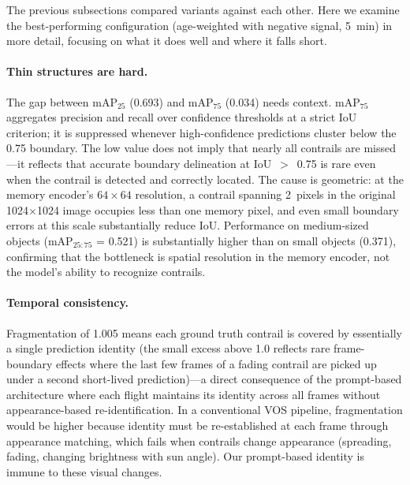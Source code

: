 \documentclass[review]{elsarticle}
\begin{document}
The previous subsections compared variants against each other. Here we examine the best-performing configuration (age-weighted with negative signal, 5~min) in more detail, focusing on what it does well and where it falls short.

\paragraph{Thin structures are hard.} The gap between mAP$_{25}$ (0.693) and mAP$_{75}$ (0.034) needs context. mAP$_{75}$ aggregates precision and recall over confidence thresholds at a strict IoU criterion; it is suppressed whenever high-confidence predictions cluster below the 0.75 boundary. The low value does not imply that nearly all contrails are missed---it reflects that accurate boundary delineation at IoU~$>$~0.75 is rare even when the contrail is detected and correctly located. The cause is geometric: at the memory encoder's $64\times64$ resolution, a contrail spanning 2~pixels in the original 1024$\times$1024 image occupies less than one memory pixel, and even small boundary errors at this scale substantially reduce IoU. Performance on medium-sized objects (mAP$_{25{:}75}$ = 0.521) is substantially higher than on small objects (0.371), confirming that the bottleneck is spatial resolution in the memory encoder, not the model's ability to recognize contrails.

\paragraph{Temporal consistency.} Fragmentation of 1.005 means each ground truth contrail is covered by essentially a single prediction identity (the small excess above 1.0 reflects rare frame-boundary effects where the last few frames of a fading contrail are picked up under a second short-lived prediction)---a direct consequence of the prompt-based architecture where each flight maintains its identity across all frames without appearance-based re-identification. In a conventional VOS pipeline, fragmentation would be higher because identity must be re-established at each frame through appearance matching, which fails when contrails change appearance (spreading, fading, changing brightness with sun angle). Our prompt-based identity is immune to these visual changes.
\end{document}
